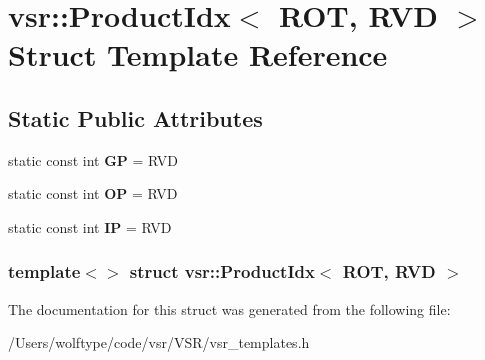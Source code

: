 \hypertarget{structvsr_1_1_product_idx_3_01_r_o_t_00_01_r_v_d_01_4}{\section{vsr\-:\-:Product\-Idx$<$ R\-O\-T, R\-V\-D $>$ Struct Template Reference}
\label{structvsr_1_1_product_idx_3_01_r_o_t_00_01_r_v_d_01_4}
}
\subsection*{Static Public Attributes}
\begin{DoxyCompactItemize}
\item 
\hypertarget{structvsr_1_1_product_idx_3_01_r_o_t_00_01_r_v_d_01_4_ac9930f963ddf6871d297d6fbe6f6b48e}{static const int {\bfseries G\-P} = R\-V\-D}\label{structvsr_1_1_product_idx_3_01_r_o_t_00_01_r_v_d_01_4_ac9930f963ddf6871d297d6fbe6f6b48e}

\item 
\hypertarget{structvsr_1_1_product_idx_3_01_r_o_t_00_01_r_v_d_01_4_a0f403112c31eae2f169776d51f4e82c5}{static const int {\bfseries O\-P} = R\-V\-D}\label{structvsr_1_1_product_idx_3_01_r_o_t_00_01_r_v_d_01_4_a0f403112c31eae2f169776d51f4e82c5}

\item 
\hypertarget{structvsr_1_1_product_idx_3_01_r_o_t_00_01_r_v_d_01_4_a0370a19e9dfa48e4aeba3c88cb71cb03}{static const int {\bfseries I\-P} = R\-V\-D}\label{structvsr_1_1_product_idx_3_01_r_o_t_00_01_r_v_d_01_4_a0370a19e9dfa48e4aeba3c88cb71cb03}

\end{DoxyCompactItemize}
\subsubsection*{template$<$$>$ struct vsr\-::\-Product\-Idx$<$ R\-O\-T, R\-V\-D $>$}



The documentation for this struct was generated from the following file\-:\begin{DoxyCompactItemize}
\item 
/\-Users/wolftype/code/vsr/\-V\-S\-R/vsr\-\_\-templates.\-h\end{DoxyCompactItemize}

